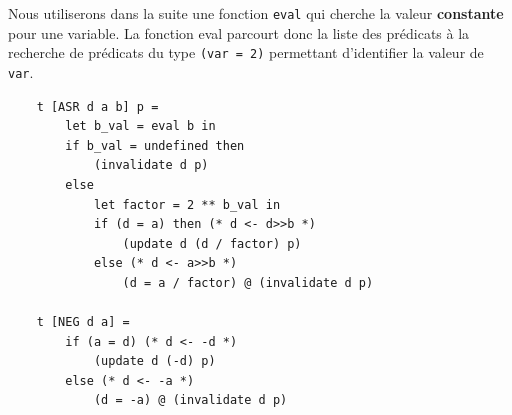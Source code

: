 \documentclass[french]{article}
\begin{document}
  Nous utiliserons dans la suite une fonction \texttt{eval} qui cherche la valeur \textbf{constante} pour une variable.
  La fonction eval parcourt donc la liste des prédicats à la recherche de prédicats du type \texttt{(var = 2)} permettant
  d'identifier la valeur de \texttt{var}.

  \begin{lstlisting}
    t [ASR d a b] p =
        let b_val = eval b in
        if b_val = undefined then
            (invalidate d p)
        else
            let factor = 2 ** b_val in
            if (d = a) then (* d <- d>>b *)
                (update d (d / factor) p)
            else (* d <- a>>b *)
                (d = a / factor) @ (invalidate d p)

    t [NEG d a] =
        if (a = d) (* d <- -d *)
            (update d (-d) p)
        else (* d <- -a *)
            (d = -a) @ (invalidate d p)
  \end{lstlisting}
\end{document}
